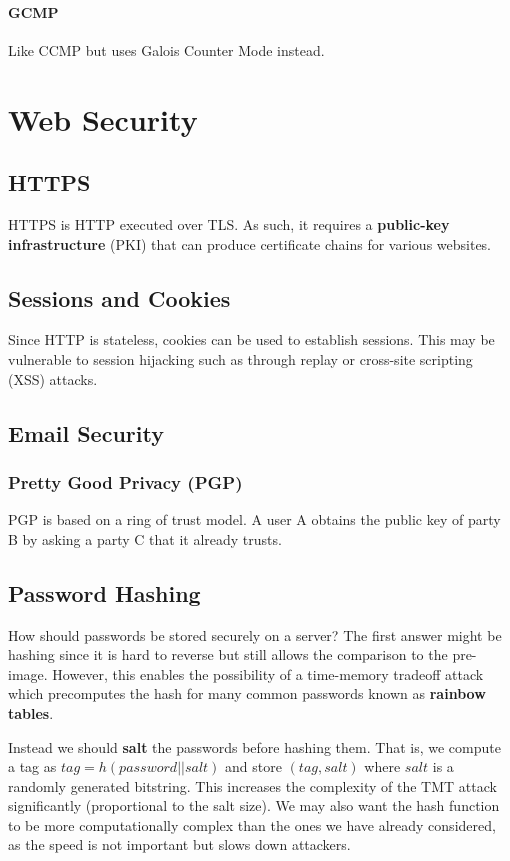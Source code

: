 \documentclass[11pt]{report}
\begin{document}
\subsubsection{GCMP}
Like CCMP but uses Galois Counter Mode instead.

\chapter{Web Security}

\section{HTTPS}
HTTPS is HTTP executed over TLS. As such, it requires a \textbf{public-key infrastructure} (PKI) that can produce certificate chains for various websites.

\section{Sessions and Cookies}
Since HTTP is stateless, cookies can be used to establish sessions. This may be vulnerable to session hijacking such as through replay or cross-site scripting (XSS) attacks.

\section{Email Security}
\subsection{Pretty Good Privacy (PGP)}
PGP is based on a ring of trust model. A user A obtains the public key of party B by asking a party C that it already trusts.

\section{Password Hashing}
How should passwords be stored securely on a server? The first answer might be hashing since it is hard to reverse but still allows the comparison to the pre-image. However, this enables the possibility of a time-memory tradeoff attack which precomputes the hash for many common passwords known as \textbf{rainbow tables}.

Instead we should \textbf{salt} the passwords before hashing them. That is, we compute a tag as $tag = h(password || salt)$ and store $(tag, salt)$ where $salt$ is a randomly generated bitstring. This increases the complexity of the TMT attack significantly (proportional to the salt size). We may also want the hash function to be more computationally complex than the ones we have already considered, as the speed is not important but slows down attackers.
\end{document}
